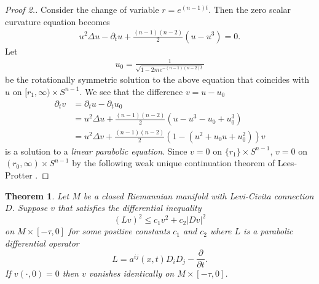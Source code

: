 \documentclass[12pt,twoside]{article}
\theoremstyle{plain}
\newtheorem{theorem}{Theorem}[section]
\theoremstyle{definition}
\theoremstyle{remark}
\newcommand{\pl}{\partial}
\newcommand{\lt}{\left}
\newcommand{\rt}{\right}
\numberwithin{equation}{section}
\begin{document}
\begin{proof}[Proof 2.]
Consider the change of variable $r = e^{(n-1)t}$. Then the zero scalar curvature equation becomes
\begin{align}
u^2 \Delta u - \pl_t u + \frac{(n-1)(n-2)}{2}(u - u^3)=0.
\end{align}
Let 
\begin{align*}
u_0 = \frac{1}{\sqrt{1 - 2m e^{-(n-1)(n-2)t}}}
\end{align*}
be the rotationally symmetric solution to the above equation that coincides with $u$ on $[r_1,\infty) \times S^{n-1}$. We see that the difference $ v = u - u_0$
\begin{align*}
\pl_t v &= \pl_t u - \pl_t u_0 \\
&= u^2 \Delta u + \frac{(n-1)(n-2)}{2} (u - u^3 - u_0 + u_0^3)\\
&= u^2 \Delta v + \frac{(n-1)(n-2)}{2} \lt(1 -(u^2 + u_0 u + u_0^2) \rt) v 
\end{align*} is a solution to a {\it linear parabolic equation}. Since $v =0$ on $\{ r_1\} \times S^{n-1}$, $v=0$ on $(r_0,\infty) \times S^{n-1}$ by the following weak unique continuation theorem of Lees-Protter \cite[Theorem 1, page 373]{LP}.
\end{proof}
\begin{theorem}
Let $M$ be a closed Riemannian manifold with Levi-Civita connection $D$. Suppose $v$ that satisfies the differential inequality 
\[ (Lv)^2 \le c_1 v^2 + c_2 |D v|^2 \]
on $M \times [-\tau, 0]$ for some positive constants $c_1$ and $c_2$ where $L$ is a parabolic differential operator
\[ L = a^{ij}(x,t) D_i D_j - \frac{\pl}{\pl t}.\] If $v(\cdot, 0)=0$ then $v$ vanishes identically on $M \times [-\tau, 0]$.
\end{theorem}
\end{document}
